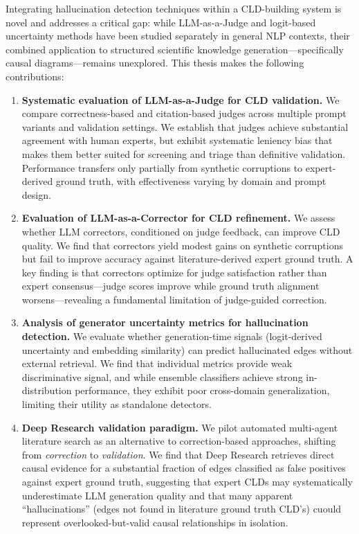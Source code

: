 Integrating hallucination detection techniques within a CLD-building system is novel and addresses a critical gap: while LLM-as-a-Judge and logit-based uncertainty methods have been studied separately in general NLP contexts, their combined application to structured scientific knowledge generation---specifically causal diagrams---remains unexplored. This thesis makes the following contributions:

\begin{enumerate}
    \item \textbf{Systematic evaluation of LLM-as-a-Judge for CLD validation.} We compare correctness-based and citation-based judges across multiple prompt variants and validation settings. We establish that judges achieve substantial agreement with human experts, but exhibit systematic leniency bias that makes them better suited for screening and triage than definitive validation. Performance transfers only partially from synthetic corruptions to expert-derived ground truth, with effectiveness varying by domain and prompt design.
    
    \item \textbf{Evaluation of LLM-as-a-Corrector for CLD refinement.} We assess whether LLM correctors, conditioned on judge feedback, can improve CLD quality. We find that correctors yield modest gains on synthetic corruptions but fail to improve accuracy against literature-derived expert ground truth. A key finding is that correctors optimize for judge satisfaction rather than expert consensus---judge scores improve while ground truth alignment worsens---revealing a fundamental limitation of judge-guided correction.
    
    \item \textbf{Analysis of generator uncertainty metrics for hallucination detection.} We evaluate whether generation-time signals (logit-derived uncertainty and embedding similarity) can predict hallucinated edges without external retrieval. We find that individual metrics provide weak discriminative signal, and while ensemble classifiers achieve strong in-distribution performance, they exhibit poor cross-domain generalization, limiting their utility as standalone detectors.
    
    \item \textbf{Deep Research validation paradigm.} We pilot automated multi-agent literature search as an alternative to correction-based approaches, shifting from \emph{correction} to \emph{validation}. We find that Deep Research retrieves direct causal evidence for a substantial fraction of edges classified as false positives against expert ground truth, suggesting that expert CLDs may systematically underestimate LLM generation quality and that many apparent ``hallucinations'' (edges not found in literature ground truth CLD's) cuould represent overlooked-but-valid causal relationships in isolation.
    

\end{enumerate}
